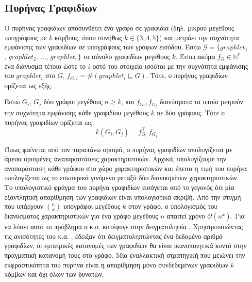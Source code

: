 \subsection{Πυρήνας Γραφιδίων}
Ο πυρήνας γραφιδίων αποσυνθέτει ένα γράφο σε γραφίδια (δηλ. μικρού μεγέθους υπογράφους με $k$ κόμβους, όπου συνήθως $k \in \{ 3,4,5\}$) \cite{prvzulj2007biological} και μετράει την συχνότητα εμφάνισης των γραφιδίων σε υπογράφους των γράφων εισόδου.
Έστω $\mathcal{G} = \{ graphlet_1$, $graphlet_2$, $\ldots$, $graphlet_r\}$ το σύνολο γραφιδίων μεγέθους $k$.
Έστω ακόμα $f_G \in \mathbb{N}^r$ ένα διάνυσμα τέτοιο ώστε το $i$-οστό του στοιχείο ισούται με την συχνότητα εμφάνισης του
$graphlet_i$ στο $G$, $f_{G,i} = \#(graphlet_i \sqsubseteq G)$.
Τότε, ο πυρήνας γραφιδίων ορίζεται ως εξής.
\begin{definition}
	Έστω $G_i$, $G_j$ δύο γράφοι μεγέθους $n \geq k$, και $f_{G_i}, f_{G_j}$ διανύσματα τα οποία μετρούν την συχνότητα εμφάνισης κάθε γραφιδίου μεγέθους $k$ σε δύο γράφους. 
	Τότε ο πυρήνας γραφιδίων ορίζεται ως
	\begin{equation}
  		k(G_i,G_j) = f_{G_i}^\top \ f_{G_j}
  	\end{equation}
\end{definition}
Όπως φαίνεται από τον παραπάνω ορισμό, ο πυρήνας γραφιδίων υπολογίζεται με άμεσα ορισμένες αναπαραστάσεις χαρακτηριστικών.
Αρχικά, υπολογίζουμε την αναπαράσταση κάθε γράφου στο χώρο χαρακτηριστικών και έπειτα η τιμή του πυρήνα υπολογίζεται ως το εσωτερικό γινόμενο μεταξύ δύο διανυσμάτων χαρακτηριστικών.
Το υπολογιστικό φράγμα του πυρήνα γραφιδίων εισάγεται από το γεγονός ότι μία εξαντλητική απαρίθμηση των γραφιδίων είναι υπολογιστικά ακριβή.
Από την στιγμή που υπάρχουν $\binom{n}{k}$ υπογράφοι μεγέθους $k$ στον γράφο, ο υπολογισμός του διανύσματος χαρακτηριστικών για ένα γράφο μεγέθους $n$ απαιτεί χρόνο $\mathcal{O}(n^k)$.
Για να λύσει αυτό το πρόβλημα ο  κ.α. κατέφυγε στην δειγματοληψία \cite{shervashidze2009efficient}. 
Χρησιμοποιώντας τις ανισότητες του  κ.α. \cite{weissman2003inequalities}, έδειξαν ότι δειγματοληπτώντας ένα δεδομένο αριθμό γραφιδίων, οι εμπειρικές κατανομές των γραφιδίων θα είναι ικανοποιητικά κοντά στην πραγματική κατανομή τους στο γράφο.
Μία εναλλακτική στρατηγική που μειώνει την εκφραστικότητα του πυρήνα είναι η απαρίθμηση μόνο συνδεδεμένων γραφιδίων $k$ κόμβων και όχι όλων των δυνατών.


